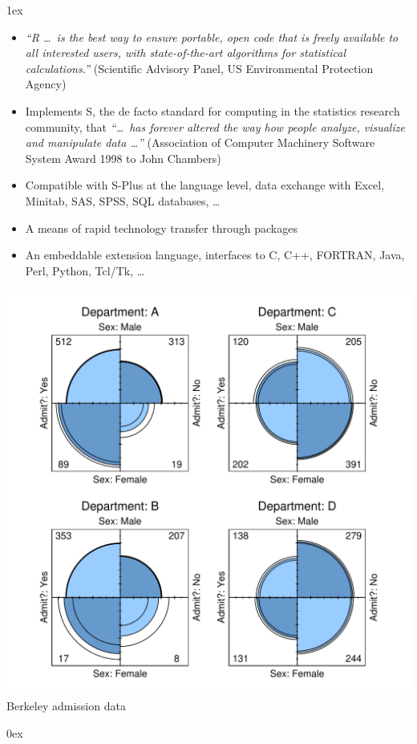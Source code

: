 \documentclass[landscape]{article}
\newlength{\colw}
\newcommand{\column}[1]{\hspace*{9mm}{}
  \parbox[t][0.99\textheight][t]{\colw}{\parskip1ex
    #1\parskip0ex}\hspace{9mm}{}}
\begin{document}
\noindent
\column{
  \begin{itemize}
   \item \emph{``R \ldots\ is the best way to ensure portable, open code that
    is freely available to all interested users, with state-of-the-art
    algorithms for statistical calculations.''} (Scientific Advisory
    Panel, US Environmental Protection Agency)
   \item Implements S, the de facto standard for computing in
    the statistics research community, that \emph{``\ldots\ has forever
      altered the way how people analyze, visualize and manipulate data
      \ldots''} (Association of Computer Machinery Software System
      Award 1998 to John Chambers)
   \item Compatible with S-Plus at the language level, data exchange
    with Excel, Minitab, SAS, SPSS, SQL databases, \ldots
   \item A means of rapid technology transfer through packages
   \item An embeddable extension language, interfaces to C, C++,
    FORTRAN, Java, Perl, Python, Tcl/Tk, \ldots
  \end{itemize}

  \vfill
  \begin{center}
    \footnotesize
    \includegraphics[width=0.9\colw]{fourfoldplot}
    \sf Berkeley admission data
  \end{center}
  }
\end{document}
